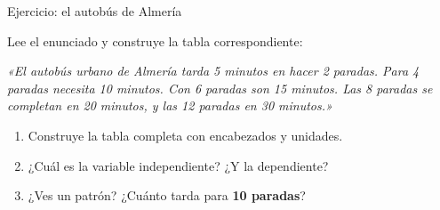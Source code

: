 \documentclass[aspectratio=169, 10pt, spanish]{beamer}
\begin{document}
\begin{frame}{Ejercicio: el autobús de Almería}
  \begin{aplicarbox}
    Lee el enunciado y construye la tabla correspondiente:

    \vspace{0.2cm}
    \begin{center}
    \begin{tcolorbox}[colback=AlmAmbar!12, colframe=AlmAmbar!60!black,
                      width=0.88\textwidth, arc=4pt, boxrule=0.8pt]
      \AlmFontSmall\itshape
      «El autobús urbano de Almería tarda 5 minutos en hacer 2 paradas.
      Para 4 paradas necesita 10 minutos.
      Con 6 paradas son 15 minutos.
      Las 8 paradas se completan en 20 minutos,
      y las 12 paradas en 30 minutos.»
    \end{tcolorbox}
    \end{center}

    \vspace{0.2cm}
    \begin{enumerate}
      \item Construye la tabla completa con encabezados y unidades.
      \item ¿Cuál es la variable independiente? ¿Y la dependiente?
      \item ¿Ves un patrón? ¿Cuánto tarda para \textbf{10 paradas}?
    \end{enumerate}
  \end{aplicarbox}
\end{frame}
\end{document}
